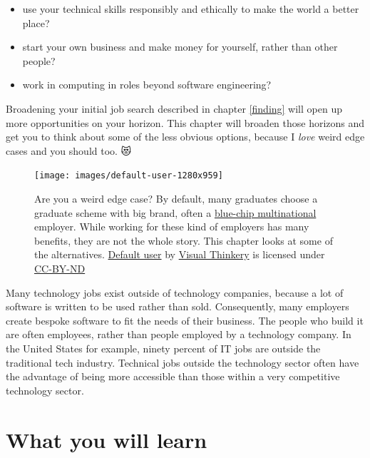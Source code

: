 \documentclass[
]{book}
\providecommand{\tightlist}{%
  \setlength{\itemsep}{0pt}\setlength{\parskip}{0pt}}
\begin{document}
\begin{itemize}
\tightlist
\item
  use your technical skills responsibly and ethically to make the world a better place?
\item
  start your own business and make money for yourself, rather than other people?
\item
  work in computing in roles beyond software engineering?
\end{itemize}

Broadening your initial job search described in chapter \ref{finding} will open up more opportunities on your horizon. This chapter will broaden those horizons and get you to think about some of the less obvious options, because I \emph{love} weird edge cases and you should too. 😻

\begin{figure}

{\centering \texttt{[image: images/default-user-1280x959]} 

}

\caption{Are you a weird edge case? By default, many graduates choose a graduate scheme with big brand, often a \href{https://en.wikipedia.org/wiki/Blue_chip_(stock_market)}{blue-chip multinational} employer. While working for these kind of employers has many benefits, they are not the whole story. This chapter looks at some of the alternatives. \href{https://bryanmmathers.com/default-user/}{Default user} by \href{https://visualthinkery.com}{Visual Thinkery} is licensed under \href{https://creativecommons.org/licenses/by-nd/4.0/}{CC-BY-ND}}\label{fig:default-user-fig}
\end{figure}



Many technology jobs exist outside of technology companies, \citep{outsideit} because a lot of software is written to be used rather than sold. Consequently, many employers create bespoke software to fit the needs of their business. The people who build it are often employees, rather than people employed by a technology company. In the United States for example, ninety percent of IT jobs are outside the traditional tech industry. Technical jobs outside the technology sector often have the advantage of being more accessible than those within a very competitive technology sector. \citep{burninglass}

\hypertarget{ilo11}{%
\section{What you will learn}\label{ilo11}}
\end{document}
